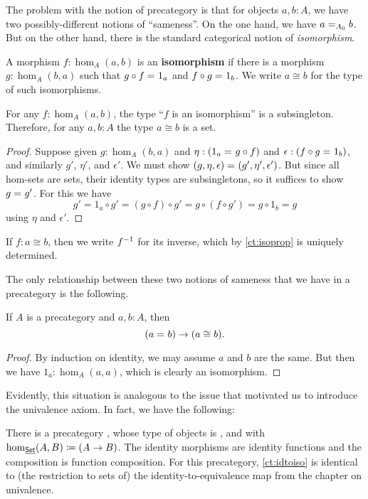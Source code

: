 The problem with the notion of precategory is that for objects $a,b:A$, we have two possibly-different notions of ``sameness''.
On the one hand, we have $\id[A_0]{a}{b}$.
But on the other hand, there is the standard categorical notion of \emph{isomorphism}.

\begin{defn}\label{ct:isomorphism}
  A morphism $f:\hom_A(a,b)$ is an \textbf{isomorphism} if there is a morphism $g:\hom_A(b,a)$ such that $\id{g\circ f}{1_a}$ and $\id{f\circ g}{1_b}$.
  We write $a\cong b$ for the type of such isomorphisms.
\end{defn}

\begin{lem}\label{ct:isoprop}
  For any $f:\hom_A(a,b)$, the type ``$f$ is an isomorphism'' is a subsingleton.
  Therefore, for any $a,b:A$ the type $a\cong b$ is a set.
\end{lem}
\begin{proof}
  Suppose given $g:\hom_A(b,a)$ and $\eta:(\id{1_a}{g\circ f})$ and $\epsilon:(\id{f\circ g}{1_b})$, and similarly $g'$, $\eta'$, and $\epsilon'$.
We must show $\id{(g,\eta,\epsilon)}{(g',\eta',\epsilon')}$.
  But since all hom-sets are sets, their identity types are subsingletons, so it suffices to show $\id g {g'}$.
  For this we have
  \[g' = 1_a\circ g' = (g\circ f)\circ g' = g\circ (f\circ g') = g\circ 1_b = g\]
  using $\eta$ and $\epsilon'$.
\end{proof}

If $f:a\cong b$, then we write $\inv f$ for its inverse, which by \autoref{ct:isoprop} is uniquely determined.

The only relationship between these two notions of sameness that we have in a precategory is the following.

\begin{lem}\label{ct:idtoiso}
  If $A$ is a precategory and $a,b:A$, then
  \[(\id a b)\to (a \cong b).\]
\end{lem}
\begin{proof}
  By induction on identity, we may assume $a$ and $b$ are the same.
  But then we have $1_a:\hom_A(a,a)$, which is clearly an isomorphism.
\end{proof}

Evidently, this situation is analogous to the issue that motivated us to introduce the univalence axiom.
In fact, we have the following:

\begin{eg}\label{ct:precatset}
  There is a precategory \uset, whose type of objects is \set, and with $\hom_{\uset}(A,B) \defeq (A\to B)$.
  The identity morphisms are identity functions and the composition is function composition.
  For this precategory, \autoref{ct:idtoiso} is identical to (the restriction to sets of) the identity-to-equivalence map from the chapter on univalence.
\end{eg}

